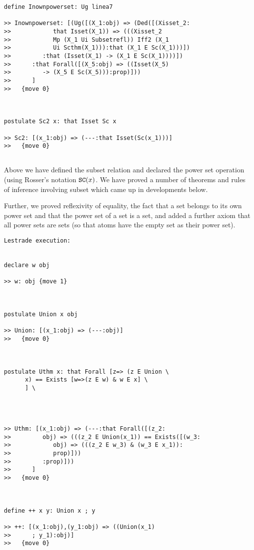 \documentclass[12pt]{article}
\begin{document}
\begin{verbatim}
define Inownpowerset: Ug linea7

>> Inownpowerset: [(Ug([(X_1:obj) => (Ded([(Xisset_2:
>>            that Isset(X_1)) => (((Xisset_2
>>            Mp (X_1 Ui Subsetrefl)) Iff2 (X_1
>>            Ui Scthm(X_1))):that (X_1 E Sc(X_1)))])
>>         :that (Isset(X_1) -> (X_1 E Sc(X_1))))])
>>      :that Forall([(X_5:obj) => ((Isset(X_5)
>>         -> (X_5 E Sc(X_5))):prop)]))
>>      ]
>>   {move 0}



postulate Sc2 x: that Isset Sc x

>> Sc2: [(x_1:obj) => (---:that Isset(Sc(x_1)))]
>>   {move 0}


\end{verbatim}

Above we have defined the subset relation and declared the power set operation  (using Rosser's notation ${\tt SC}(x)$.  We have proved a number of theorems and rules of inference involving subset which came up in developments below.

Further, we proved reflexivity of equality, the fact that a set belongs to its own power set and that the power set of a set is a set,
and added a further axiom that all power sets are sets (so that atoms have the empty set as their power set).

\begin{verbatim}Lestrade execution:


declare w obj

>> w: obj {move 1}



postulate Union x obj

>> Union: [(x_1:obj) => (---:obj)]
>>   {move 0}



postulate Uthm x: that Forall [z=> (z E Union \
      x) == Exists [w=>(z E w) & w E x] \
      ] \
   



>> Uthm: [(x_1:obj) => (---:that Forall([(z_2:
>>         obj) => (((z_2 E Union(x_1)) == Exists([(w_3:
>>            obj) => (((z_2 E w_3) & (w_3 E x_1)):
>>            prop)]))
>>         :prop)]))
>>      ]
>>   {move 0}



define ++ x y: Union x ; y

>> ++: [(x_1:obj),(y_1:obj) => ((Union(x_1)
>>      ; y_1):obj)]
>>   {move 0}


\end{verbatim}
\end{document}
